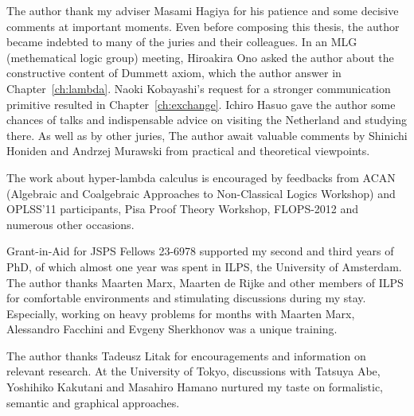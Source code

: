 \begin{acknowledge}
 The author thank my adviser Masami Hagiya for his patience and some decisive
 comments at important moments.
 Even before composing this thesis, the author became indebted to many of the
 juries and their colleagues.
 In an MLG (methematical logic group) meeting, Hiroakira Ono asked the author
 about the constructive content of Dummett axiom, which the author answer in
 Chapter~\ref{ch:lambda}.
 Naoki Kobayashi's request for a stronger communication primitive
 resulted in Chapter~\ref{ch:exchange}.
 Ichiro Hasuo gave the author some chances of talks and
 indispensable advice on visiting the Netherland
 and studying there.
 As well as by other juries,
 The author await valuable comments by Shinichi Honiden and Andrzej Murawski from
 practical and theoretical viewpoints.

 The work about hyper-lambda calculus is encouraged by feedbacks from
 ACAN (Algebraic and Coalgebraic Approaches to
 Non-Classical Logics Workshop) and OPLSS'11 participants,
 Pisa Proof Theory Workshop, FLOPS-2012
 and numerous other occasions.

 Grant-in-Aid for JSPS Fellows 23-6978 supported
 my second and third years of PhD, of which almost one year was spent
 in ILPS, the University of Amsterdam.
 The author thanks Maarten Marx, Maarten de Rijke and other members of ILPS for
 comfortable environments and stimulating discussions during my stay.
 Especially, working on heavy problems for months with Maarten Marx, Alessandro
 Facchini and Evgeny Sherkhonov was a unique training.

 The author thanks Tadeusz Litak for encouragements and
 information on relevant research.
 At the University of Tokyo,
 discussions with Tatsuya Abe, Yoshihiko Kakutani and Masahiro Hamano
 nurtured my taste on formalistic, semantic and graphical approaches.
\end{acknowledge}
